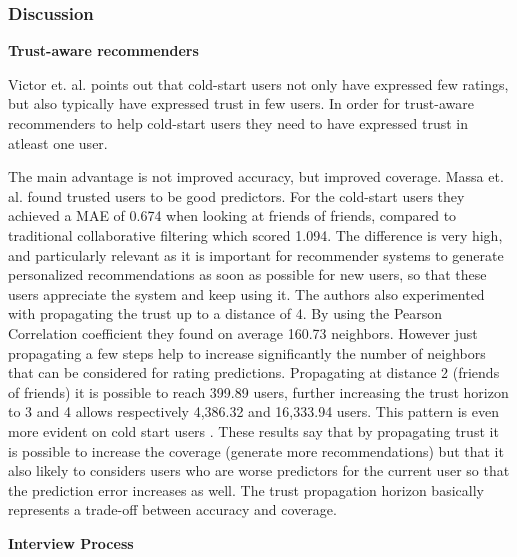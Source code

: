 \subsubsection{Discussion}



\textbf{Trust-aware recommenders}

%

Victor et. al. \cite{Victor2008} points out that cold-start users not only have expressed few ratings, but also typically have expressed trust in few users. In order for trust-aware recommenders to help cold-start users they need to have expressed trust in atleast one user.


The main advantage is not improved accuracy, but improved coverage. Massa et. al. \cite{Massa2007} found trusted users to be good predictors. For the cold-start users they achieved a MAE of 0.674 when looking at friends of friends, compared to traditional collaborative filtering which scored 1.094. The difference is very high, and particularly relevant as it is important for recommender systems to generate personalized recommendations as soon as possible for new users, so that these users appreciate the system and keep using it. The authors also experimented with
propagating the trust up to a distance of 4. By using the Pearson Correlation
coefficient they found on average 160.73 neighbors. However just propagating a
few steps help to increase significantly the number of neighbors that can be
considered for rating predictions. Propagating at distance 2 (friends of
friends) it is possible to reach 399.89 users, further increasing the trust
horizon to 3 and 4 allows respectively 4,386.32 and 16,333.94 users. This
pattern is even more evident on cold start users \cite{Massa2004}. These
results say that by propagating trust it is possible to increase the coverage
(generate more recommendations) but that it also likely to considers users who are worse
predictors for the current user so that the prediction error increases as well.
The trust propagation horizon basically represents a trade-off between accuracy
and coverage.


\textbf{Interview Process}

